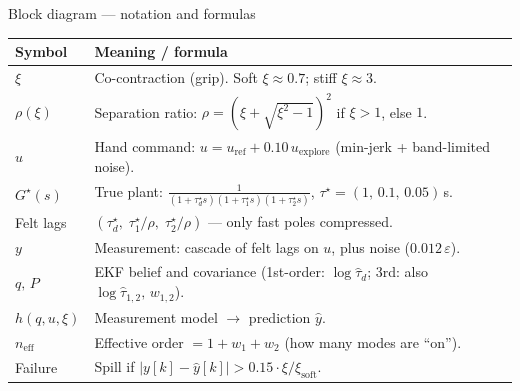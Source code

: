 \documentclass[aspectratio=169, 11pt]{beamer}
\begin{document}
\begin{frame}{Block diagram --- notation and formulas}
\small
\begin{center}
\begin{tabular}{@{}ll@{}}
\toprule
\textbf{Symbol} & \textbf{Meaning / formula} \\
\midrule
$\xi$
  & Co-contraction (grip). Soft $\xi\approx0.7$; stiff $\xi\approx3$. \\
$\rho(\xi)$
  & Separation ratio:
    $\rho=(\xi+\sqrt{\xi^2-1})^2$ if $\xi>1$, else $1$. \\
$u$
  & Hand command:
    $u=u_{\mathrm{ref}}+0.10\,u_{\mathrm{explore}}$
    (min-jerk + band-limited noise). \\
$G^\star(s)$
  & True plant:
    $\displaystyle\frac{1}{(1+\tau_d^\star s)(1+\tau_1^\star s)(1+\tau_2^\star s)}$,
    $\tau^\star=(1,\,0.1,\,0.05)$\,s. \\
Felt lags
  & $(\tau_d^\star,\;\tau_1^\star/\rho,\;\tau_2^\star/\rho)$
    --- only fast poles compressed. \\
$y$
  & Measurement: cascade of felt lags on $u$, plus noise
    ($0.012\,\varepsilon$). \\
$q,\,P$
  & EKF belief and covariance
    (1st-order: $\log\hat\tau_d$;
     3rd: also $\log\hat\tau_{1,2},\,w_{1,2}$). \\
$h(q,u,\xi)$
  & Measurement model $\to$ prediction $\hat y$. \\
$n_{\mathrm{eff}}$
  & Effective order $=1+w_1+w_2$ (how many modes are ``on''). \\
Failure
  & Spill if $|y[k]-\hat y[k]|>0.15\cdot\xi/\xi_{\mathrm{soft}}$. \\
\bottomrule
\end{tabular}
\end{center}
\end{frame}
\end{document}
